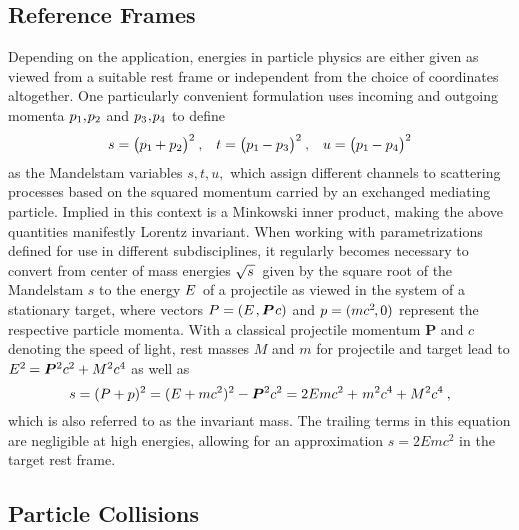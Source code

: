 \begin{spacing}{0.985}
	\subsection{Reference Frames}
	\label{sub:frames}

	Depending on the application, energies in particle physics are either given as viewed from a suitable rest frame or independent from
	the choice of coordinates altogether. One particularly convenient formulation uses incoming and outgoing momenta
	$p_1 , \kern-1.0pt p_2$ and $p_3 \kern+0.5pt , \kern-1.0pt p_4$ to define
	\begin{align*}
		s = \bigl( p_1 \kern-0.5pt + p_2 \bigr)^2 \: , &&
		t = \bigl( p_1 \kern-0.5pt - p_3 \bigr)^2 \: , &&
		u = \bigl( p_1 \kern-0.5pt - p_4 \bigr)^2
	\end{align*}
	as the Mandelstam variables $s, t, u,$ which assign different channels to scattering processes based on the squared momentum carried
	by an exchanged mediating particle. Implied in this context is a Minkowski inner product, making the above quantities manifestly Lorentz
	invariant. When working with parametrizations defined for use in different subdisciplines, it regularly becomes necessary to convert
	from center of mass energies $\sqrt{s \kern+1.0pt} \kern+1.0pt$ given by the square root of the Mandelstam $s$ to the energy
	$\kern-0.5pt E \kern+1.0pt$ of a projectile as viewed in the system of a stationary target, where vectors
	$P = (E \kern+1.0pt , \bm{P} \kern+0.75pt c)$ and $p = (m c^2 \kern-1.0pt , 0)$ represent the respective particle momenta.
	With a classical projectile momentum $\bm{P}$ and $c$ denoting the speed of light, rest masses $M$ and $m$ for projectile
	and target lead to $E^2 \kern-0.5pt = \bm{P}^2 c^2 + M^2 c^4$ as well as
	\begin{equation*}
		s = (P + p)^2 = (E + m c^2)^2 - \bm{P}^2 c^2 = 2E m c^2 + \kern+1.0pt m^2 c^4 + M^2 c^4 \: ,
	\end{equation*}
	which is also referred to as the invariant mass. The trailing terms in this equation are negligible at high energies, allowing
	for an approximation $s = 2E m c^2$ in the target rest frame.



	\subsection{Particle Collisions}
	\label{sub:collisions}


\end{spacing}
